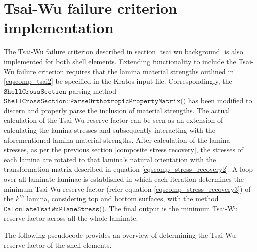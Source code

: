 \section{Tsai-Wu failure criterion implementation}
The Tsai-Wu failure criterion described in section \ref{tsai wu background} is also implemented for both shell elements. Extending functionality to include the Tsai-Wu failure criterion requires that the lamina material strengths outlined in \ref{eqscomp_tsai2} be specified in the Kratos input file. Correspondingly, the $\texttt{ShellCrossSection}$ parsing method \linebreak$\texttt{ShellCrossSection::ParseOrthotropicPropertyMatrix()}$ has been modified to discern and properly parse the inclusion of material strengths. The actual calculation of the Tsai-Wu reserve factor can be seen as an extension of calculating the lamina stresses and subsequently interacting with the aforementioned lamina material strengths. After calculation of the lamina stresses, as per the previous section \ref{composite stress recovery}, the stresses of each lamina are rotated to that lamina's natural orientation with the transformation matrix described in equation \ref{eqscomp_stress_recovery2}. A loop over all laminate laminae is established in which each iteration determines the minimum Tsai-Wu reserve factor (refer equation \ref{eqscomp_stress_recovery3}) of the $k^{th}$ lamina, considering top and bottom surfaces, with the method $\texttt{CalculateTsaiWuPlaneStress()}$. The final output is the minimum Tsai-Wu reserve factor across all the whole laminate.

The following pseudocode provides an overview of determining the Tsai-Wu reserve factor of the shell elements.


